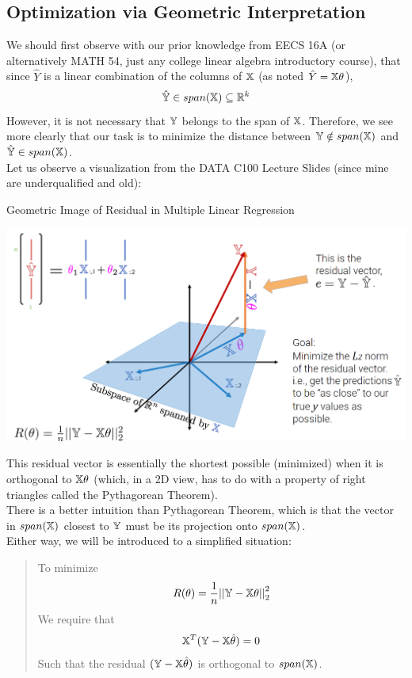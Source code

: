 \subsection{Optimization via Geometric Interpretation}
We should first observe with our prior knowledge from EECS 16A (or alternatively MATH 54, just any college linear algebra introductory course), that since $\hat{Y}$ is a linear combination of the columns of $\mathbb{X}$ (as noted $\hat{Y} = \mathbb{X} \theta$),
\[\hat{\mathbb{Y}} \in span(\mathbb{X}) \subseteq \mathbb{R}^k\]
However, it is not necessary that $\mathbb{Y}$ belongs to the span of $\mathbb{X}$. Therefore, we see more clearly that our task is to minimize the distance between $\mathbb{Y} \notin span(\mathbb{X})$ and $\hat{\mathbb{Y}} \in span(\mathbb{X})$. \\
Let us observe a visualization from the DATA C100 Lecture Slides (since mine are underqualified and old):
\begin{ln-fig}{Geometric Image of Residual in Multiple Linear Regression}{}
    \begin{center}
        \includegraphics[scale=0.3]{figs/ln03/least-square-geometry.png}
    \end{center}
\end{ln-fig}
This residual vector is essentially the shortest possible (minimized) when it is orthogonal to $\mathbb{X} \theta$ (which, in a 2D view, has to do with a property of right triangles called the Pythagorean Theorem). \\
There is a better intuition than Pythagorean Theorem, which is that the vector in $span(\mathbb{X})$ closest to $\mathbb{Y}$ must be its projection onto $span(\mathbb{X})$. \\
Either way, we will be introduced to a simplified situation:
\begin{quote}
    To minimize 
    \[R(\theta) = \frac{1}{n} {||\mathbb{Y} - \mathbb{X} \theta||}_2^2\]
    We require that
    \[\mathbb{X}^T (\mathbb{Y} - \mathbb{X} \hat{\theta}) = 0\]
    Such that the residual $(\mathbb{Y} - \mathbb{X} \hat{\theta})$ is orthogonal to $span(\mathbb{X})$.
\end{quote}

